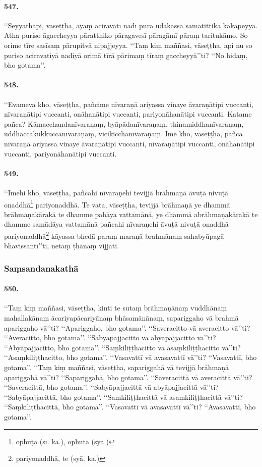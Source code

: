 \paragraph{547.} ‘‘Seyyathāpi, vāseṭṭha, ayaṃ aciravatī nadī pūrā udakassa samatittikā kākapeyyā. Atha puriso āgaccheyya pāratthiko pāragavesī pāragāmī pāraṃ taritukāmo. So orime tīre sasīsaṃ pārupitvā nipajjeyya. ‘‘Taṃ kiṃ maññasi, vāseṭṭha, api nu so puriso aciravatiyā nadiyā orimā tīrā pārimaṃ tīraṃ gaccheyyā’’ti? ‘‘No hidaṃ, bho gotama’’.

\paragraph{548.} ‘‘Evameva kho, vāseṭṭha, pañcime nīvaraṇā ariyassa vinaye āvaraṇātipi vuccanti, nīvaraṇātipi vuccanti, onāhanātipi vuccanti, pariyonāhanātipi vuccanti. Katame pañca? Kāmacchandanīvaraṇaṃ, byāpādanīvaraṇaṃ, thinamiddhanīvaraṇaṃ, uddhaccakukkuccanīvaraṇaṃ, vicikicchānīvaraṇaṃ. Ime kho, vāseṭṭha, pañca nīvaraṇā ariyassa vinaye āvaraṇātipi vuccanti, nīvaraṇātipi vuccanti, onāhanātipi vuccanti, pariyonāhanātipi vuccanti.

\paragraph{549.} ‘‘Imehi kho, vāseṭṭha, pañcahi nīvaraṇehi tevijjā brāhmaṇā āvuṭā nivuṭā onaddhā\footnote{ophuṭā (sī. ka.), ophutā (syā.)} pariyonaddhā. Te vata, vāseṭṭha, tevijjā brāhmaṇā ye dhammā brāhmaṇakārakā te dhamme pahāya vattamānā, ye dhammā abrāhmaṇakārakā te dhamme samādāya vattamānā pañcahi nīvaraṇehi āvuṭā nivuṭā onaddhā pariyonaddhā\footnote{pariyonaddhā, te (syā. ka.)} kāyassa bhedā paraṃ maraṇā brahmānaṃ sahabyūpagā bhavissantī’’ti, netaṃ ṭhānaṃ vijjati.

\subsubsection{Saṃsandanakathā}

\paragraph{550.} ‘‘Taṃ kiṃ maññasi, vāseṭṭha, kinti te sutaṃ brāhmaṇānaṃ vuddhānaṃ mahallakānaṃ ācariyapācariyānaṃ bhāsamānānaṃ, sapariggaho vā brahmā apariggaho vā’’ti? ‘‘Apariggaho, bho gotama’’. ‘‘Saveracitto vā averacitto vā’’ti? ‘‘Averacitto, bho gotama’’. ‘‘Sabyāpajjacitto vā abyāpajjacitto vā’’ti? ‘‘Abyāpajjacitto, bho gotama’’. ‘‘Saṃkiliṭṭhacitto vā asaṃkiliṭṭhacitto vā’’ti? ‘‘Asaṃkiliṭṭhacitto, bho gotama’’. ‘‘Vasavattī vā avasavattī vā’’ti? ‘‘Vasavattī, bho gotama’’. ‘‘Taṃ kiṃ maññasi, vāseṭṭha, sapariggahā vā tevijjā brāhmaṇā apariggahā vā’’ti? ‘‘Sapariggahā, bho gotama’’. ‘‘Saveracittā vā averacittā vā’’ti? ‘‘Saveracittā, bho gotama’’. ‘‘Sabyāpajjacittā vā abyāpajjacittā vā’’ti? ‘‘Sabyāpajjacittā, bho gotama’’. ‘‘Saṃkiliṭṭhacittā vā asaṃkiliṭṭhacittā vā’’ti? ‘‘Saṃkiliṭṭhacittā, bho gotama’’. ‘‘Vasavattī vā avasavattī vā’’ti? ‘‘Avasavattī, bho gotama’’.

